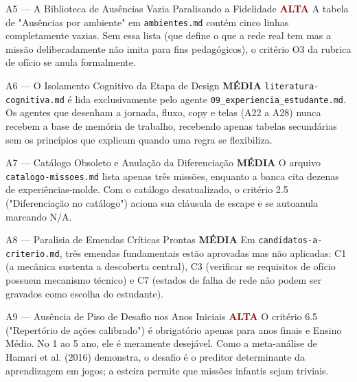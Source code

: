 \documentclass[11pt,a4paper]{article}
\newcommand{\sevalta}{\textcolor{DarkRed}{\textbf{ALTA}}}
\newcommand{\sevmedia}{\textcolor{DarkYellow}{\textbf{M\'EDIA}}}
\begin{document}
\begin{achadobox}{A5 --- A Biblioteca de Aus\^encias Vazia Paralisando a Fidelidade \hfill \sevalta}
A tabela de "Aus\^encias por ambiente" em \texttt{ambientes.md} cont\'em cinco linhas completamente vazias. Sem essa lista (que define o que a rede real tem mas a miss\~ao deliberadamente n\~ao imita para fins pedag\'ogicos), o crit\'erio O3 da rubrica de of\'icio se anula formalmente.
\end{achadobox}

\begin{achadobox}{A6 --- O Isolamento Cognitivo da Etapa de Design \hfill \sevmedia}
\texttt{literatura-cognitiva.md} \'e lida exclusivamente pelo agente \texttt{09\_experiencia\_estudante.md}. Os agentes que desenham a jornada, fluxo, copy e telas (A22 a A28) nunca recebem a base de mem\'oria de trabalho, recebendo apenas tabelas secund\'arias sem os princ\'ipios que explicam quando uma regra se flexibiliza.
\end{achadobox}

\begin{achadobox}{A7 --- Cat\'alogo Obsoleto e Anula\c{c}\~ao da Diferencia\c{c}\~ao \hfill \sevmedia}
O arquivo \texttt{catalogo-missoes.md} lista apenas tr\^es miss\~oes, enquanto a banca cita dezenas de experi\^encias-molde. Com o cat\'alogo desatualizado, o crit\'erio 2.5 ("Diferencia\c{c}\~ao no cat\'alogo") aciona sua cl\'ausula de escape e se autoanula marcando N/A.
\end{achadobox}

\begin{achadobox}{A8 --- Paralisia de Emendas Cr\'iticas Prontas \hfill \sevmedia}
Em \texttt{candidatos-a-criterio.md}, tr\^es emendas fundamentais est\~ao aprovadas mas n\~ao aplicadas: C1 (a mec\^anica sustenta a descoberta central), C3 (verificar se requisitos de of\'icio possuem mecanismo t\'ecnico) e C7 (estados de falha de rede n\~ao podem ser gravados como escolha do estudante).
\end{achadobox}

\begin{achadobox}{A9 --- Aus\^encia de Piso de Desafio nos Anos Iniciais \hfill \sevalta}
O crit\'erio 6.5 ("Repert\'orio de a\c{c}\~oes calibrado") \'e obrigat\'orio apenas para anos finais e Ensino M\'edio. No 1\textordmasculine{} ao 5\textordmasculine{} ano, ele \'e meramente desej\'avel. Como a meta-an\'alise de Hamari et al. (2016) demonstra, o desafio \'e o preditor determinante da aprendizagem em jogos; a esteira permite que miss\~oes infantis sejam triviais.
\end{achadobox}
\end{document}
